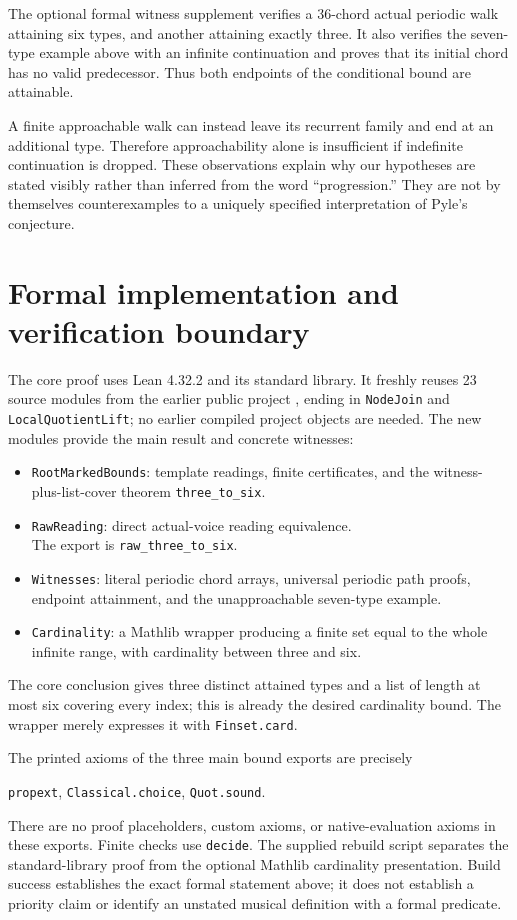 \documentclass[11pt]{article}
\begin{document}
The optional formal witness supplement verifies a 36-chord actual periodic
walk attaining six types, and another attaining exactly three. It also
verifies the seven-type example above with an infinite continuation and
proves that its initial chord has no valid predecessor. Thus both endpoints
of the conditional bound are attainable.

A finite approachable walk can instead leave its recurrent family and end at
an additional type. Therefore approachability alone is insufficient if
indefinite continuation is dropped. These observations explain why our
hypotheses are stated visibly rather than inferred from the word
``progression.'' They are not by themselves counterexamples to a uniquely
specified interpretation of Pyle's conjecture.

\section{Formal implementation and verification boundary}
The core proof uses Lean 4.32.2 and its standard library. It freshly reuses
23 source modules from the earlier public project \cite{Prior}, ending in
\texttt{NodeJoin} and \texttt{LocalQuotientLift}; no earlier compiled project
objects are needed. The new modules provide the main result and concrete witnesses:
\begin{itemize}
\item \texttt{RootMarkedBounds}: template readings, finite certificates,
and the witness-plus-list-cover theorem \texttt{three\_to\_six}.
\item \texttt{RawReading}: direct actual-voice reading equivalence.\\
The export is \texttt{raw\_three\_to\_six}.
\item \texttt{Witnesses}: literal periodic chord arrays, universal periodic
path proofs, endpoint attainment, and the unapproachable seven-type example.
\item \texttt{Cardinality}: a Mathlib wrapper producing a finite set equal
to the whole infinite range, with cardinality between three and six.
\end{itemize}
The core conclusion gives three distinct attained types and a list of length
at most six covering every index; this is already the desired cardinality
bound. The wrapper merely expresses it with \texttt{Finset.card}.

The printed axioms of the three main bound exports are precisely
\begin{center}\texttt{propext}, \texttt{Classical.choice}, \texttt{Quot.sound}.\end{center}
There are no proof placeholders, custom axioms, or native-evaluation axioms
in these exports. Finite checks use \texttt{decide}. The supplied rebuild
script separates the standard-library proof from the optional Mathlib
cardinality presentation. Build success establishes the exact formal
statement above; it does not establish a priority claim or identify an
unstated musical definition with a formal predicate.
\end{document}
